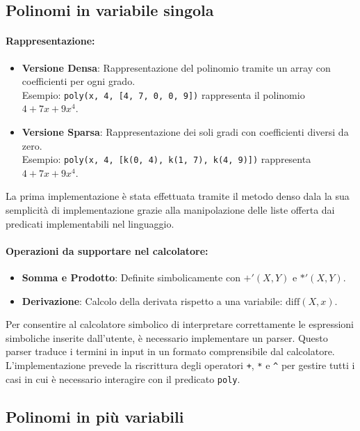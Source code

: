 \documentclass[12pt,twoside]{report}
\begin{document}
\subsection*{Polinomi in variabile singola}
\paragraph{Rappresentazione:}
\begin{itemize}
    \item \textbf{Versione Densa}: Rappresentazione del polinomio tramite un array con coefficienti per ogni grado.\\
    Esempio: \texttt{poly(x, 4, [4, 7, 0, 0, 9])} rappresenta il polinomio $4 + 7x + 9x^4$.
    \item \textbf{Versione Sparsa}: Rappresentazione dei soli gradi con coefficienti diversi da zero.\\
    Esempio: \texttt{poly(x, 4, [k(0, 4), k(1, 7), k(4, 9)])} rappresenta $4 + 7x + 9x^4$.
\end{itemize}

La prima implementazione è stata effettuata tramite il metodo denso dala la sua semplicità di implementazione grazie alla manipolazione delle liste offerta dai predicati implementabili nel linguaggio.

\paragraph{Operazioni da supportare nel calcolatore:}
\begin{itemize}
    \item \textbf{Somma e Prodotto}: Definite simbolicamente con $+'(X, Y)$ e $*'(X, Y)$.
    \item \textbf{Derivazione}: Calcolo della derivata rispetto a una variabile: $\text{diff}(X, x)$.
\end{itemize}

Per consentire al calcolatore simbolico di interpretare correttamente le espressioni simboliche inserite dall'utente, è necessario implementare un parser. Questo parser traduce i termini in input in un formato comprensibile dal calcolatore. L'implementazione prevede la riscrittura degli operatori \texttt{+}, \texttt{*} e \texttt{\textasciicircum} per gestire tutti i casi in cui è necessario interagire con il predicato \texttt{poly}.


\subsection*{Polinomi in più variabili}
\end{document}
